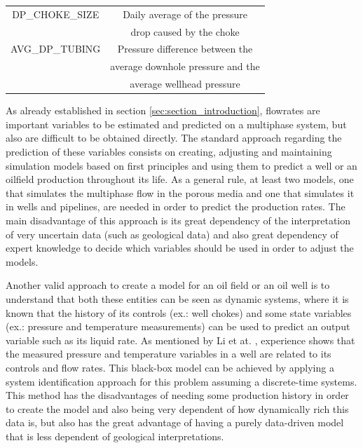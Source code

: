 \documentclass[conference]{IEEEtran}
\begin{document}
\begin{table}[htbp]
\begin{center}
\begin{tabular}{|c|c|}
\hline
DP\_CHOKE\_SIZE            &   Daily average of the pressure \\
                           &   drop caused by the choke \\
\hline
AVG\_DP\_TUBING            &   Pressure difference between the\\
                           &   average downhole pressure and the \\
                           &   average wellhead pressure \\
\hline
\end{tabular}
\label{tab:volve_variables}
\end{center}
\end{table}

As already established in section \ref{sec:section_introduction}, flowrates are important variables 
to be estimated and predicted on a multiphase system, but also are difficult to be obtained 
directly. The standard approach regarding the prediction of these variables consists on 
creating, adjusting and maintaining simulation models based on first principles and using them 
to predict a well or an oilfield production throughout its life. As a general rule, at least 
two models, one that simulates the multiphase flow in the porous media and one that simulates 
it in wells and pipelines, are needed in order to predict the production rates. The main 
disadvantage of this approach is its great dependency of the interpretation of very uncertain 
data (such as geological data) and also great dependency of expert knowledge to decide which 
variables should be used in order to adjust the models.

Another valid approach to create a model for an oil field or an oil well is to understand that 
both these entities can be seen as dynamic systems, where it is known that the history of its 
controls (ex.: well chokes) and some state variables (ex.: pressure and temperature measurements) 
can be used to predict an output variable such as its liquid rate. As mentioned by Li et at. 
\cite{Li2019}, experience shows that the measured pressure and temperature variables in a well 
are related to its controls and flow rates. This black-box model can be achieved by applying a 
system identification approach for this problem assuming a discrete-time systems. This method 
has the disadvantages of needing some production history in order to create the model and also 
being very dependent of how dynamically rich this data is, but also has the great advantage of 
having a purely data-driven model that is less dependent of geological interpretations.
\end{document}
